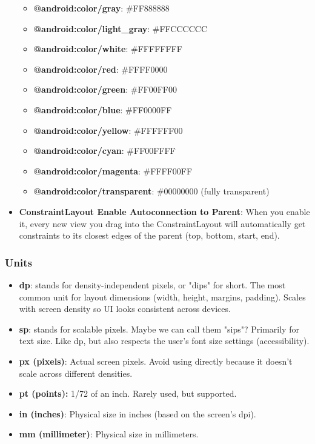 \documentclass{report}
\begin{document}
\begin{itemize}
\begin{itemize}
                \item \textbf{@android:color/gray}: \#FF888888
                \item \textbf{@android:color/light\_gray}: \#FFCCCCCC
                \item \textbf{@android:color/white}: \#FFFFFFFF
                \item \textbf{@android:color/red}: \#FFFF0000
                \item \textbf{@android:color/green}: \#FF00FF00
                \item \textbf{@android:color/blue}: \#FF0000FF
                \item \textbf{@android:color/yellow}: \#FFFFFF00
                \item \textbf{@android:color/cyan}: \#FF00FFFF
                \item \textbf{@android:color/magenta}: \#FFFF00FF
                \item \textbf{@android:color/transparent}: \#00000000 (fully transparent)
            \end{itemize}
        \item \textbf{ConstraintLayout Enable Autoconnection to Parent}: When you enable it, every new view you drag into the ConstraintLayout will automatically get constraints to its closest edges of the parent (top, bottom, start, end).
    \end{itemize}

    \pagebreak 
    \subsubsection{Units}
    \begin{itemize}
        \item \textbf{dp}: stands for density-independent pixels, or "dips" for short.
            \bigbreak \noindent 
            The most common unit for layout dimensions (width, height, margins, padding). Scales with screen density so UI looks consistent across devices.
        \item \textbf{sp}: stands for scalable pixels. Maybe we can call them "sips"?
            \bigbreak \noindent 
            Primarily for text size. Like dp, but also respects the user’s font size settings (accessibility).
        \item \textbf{px (pixels)}: Actual screen pixels. Avoid using directly because it doesn’t scale across different densities.
        \item \textbf{pt (points):} 1/72 of an inch. Rarely used, but supported.
        \item \textbf{in (inches)}: Physical size in inches (based on the screen’s dpi).
        \item \textbf{mm (millimeter)}: Physical size in millimeters.
    \end{itemize}
\end{document}
